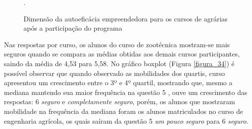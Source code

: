 \begin{figure}[h]
\center
\caption{Dimensão da autoeficácia empreendedora para os cursos de agrárias após a participação do programa}
\qquad
{}
.
\label{figura_29}
\end{figure}
\newpage


Nas respostas por curso, os alunos do curso de zootécnica mostram-se mais seguros quando se compara as médias obtidas aos demais cursos participantes, saindo da média de 4,53 para 5,58. No gráfico boxplot (Figura \ref{figura_34}) é possível observar que quando observado as mobilidades dos quartis, curso apresentou um crescimento entre o 3º e 4º quartil, mostrando que, mesmo a mediana mantendo sua maior frequência na questão 5 \textit{}, ouve um crescimento das respostas: 6 \textit{seguro} e \textit{completamente seguro}, porém, os alunos que mostraram mobilidade na frequência da mediana foram os alunos matriculados no curso de engenharia agrícola, os quais saíram da questão 5 \textit{um pouco seguro} para 6 \textit{seguro}. 

